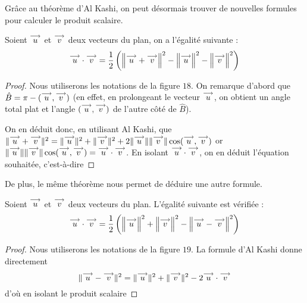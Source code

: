 Grâce au théorème d'Al Kashi, on peut désormais trouver de nouvelles formules pour calculer le produit scalaire.

\begin{prop}
    Soient $\overset{\longrightarrow}{u}$ et $\overset{\longrightarrow}{v}$ deux vecteurs du plan, on a l'égalité suivante :
    $$\overset{\longrightarrow}{u} \cdot \overset{\longrightarrow}{v} = \frac{1}{2}\left(\left\|\overset{\longrightarrow}{u} + \overset{\longrightarrow}{v}\right\|^2-\left\|\overset{\longrightarrow}{u}\right\|^2 - \left\|\overset{\longrightarrow}{v}\right\|^2\right)$$
\end{prop}


\begin{proof}
    Nous utiliserons les notations de la figure $18$. On remarque d'abord que $\hat B=\pi-(\overset{\longrightarrow}{u},\overset{\longrightarrow}{v})$ (en effet, en prolongeant le vecteur $\overset{\longrightarrow}{u}$, on obtient un angle total plat et l'angle $(\overset{\longrightarrow}{u},\overset{\longrightarrow}{v})$ de l'autre côté de $\hat B$).
    
    On en déduit donc, en utilisant Al Kashi, que $\|\overset{\longrightarrow}{u} + \overset{\longrightarrow}{v}\|^2=\|\overset{\longrightarrow}{u}\|^2+\|\overset{\longrightarrow}{v}\|^2+2\|\overset{\longrightarrow}{u}\|\|\overset{\longrightarrow}{v}\|\cos(\overset{\longrightarrow}{u},\overset{\longrightarrow}{v})$ or$\|\overset{\longrightarrow}{u}\|\|\overset{\longrightarrow}{v}\|\cos(\overset{\longrightarrow}{u},\overset{\longrightarrow}{v})=\overset{\longrightarrow}{u} \cdot \overset{\longrightarrow}{v}$. En isolant $\overset{\longrightarrow}{u} \cdot \overset{\longrightarrow}{v}$, on en déduit l'équation souhaitée, c'est-à-dire  
\end{proof}

De plus, le même théorème nous permet de déduire une autre formule.

\begin{prop}
    Soient $\overset{\longrightarrow}{u}$ et $\overset{\longrightarrow}{v}$ deux vecteurs du plan. L'égalité suivante est vérifiée :
    $$\overset{\longrightarrow}{u} \cdot \overset{\longrightarrow}{v} = \frac{1}{2}\left(\left\|\overset{\longrightarrow}{u}\right\|^2 + \left\|\overset{\longrightarrow}{v}\right\|^2 - \left\|\overset{\longrightarrow}{u} - \overset{\longrightarrow}{v}\right\|^2\right)
    $$
\end{prop}


\begin{proof}
    Nous utiliserons les notations de la figure $19$. La formule d'Al Kashi donne directement 
    $$\|\overset{\longrightarrow}{u} - \overset{\longrightarrow}{v}\|^2=\|\overset{\longrightarrow}{u}\|^2 + \|\overset{\longrightarrow}{v}\|^2-2\overset{\longrightarrow}{u}\cdot \overset{\longrightarrow}{v}$$
    d'où en isolant le produit scalaire 
\end{proof}

